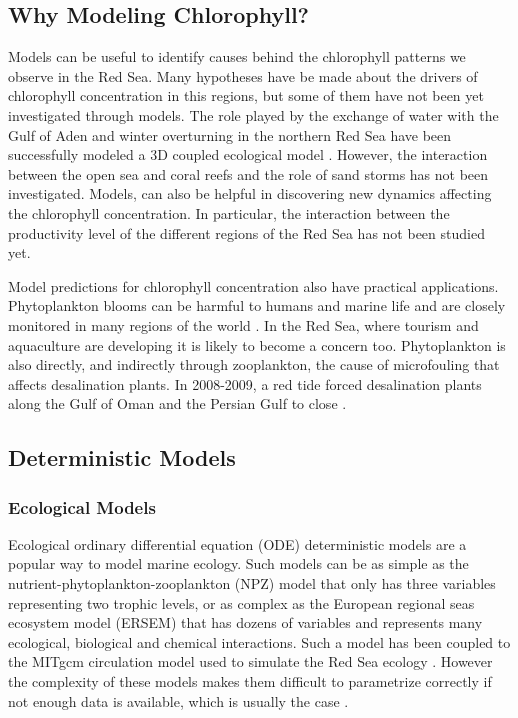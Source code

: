 \subsection{Why Modeling Chlorophyll?}

Models can be useful to identify causes behind the chlorophyll patterns we observe in the Red Sea. Many hypotheses have be made about the drivers of chlorophyll concentration in this regions, but some of them have not been yet investigated through models. The role played by the exchange of water with the Gulf of Aden and winter overturning in the northern Red Sea have been successfully modeled a 3D coupled ecological model \cite{Triantafyllou2014}. However, the interaction between the open sea and coral reefs and the role of sand storms has not been investigated. Models, can also be helpful in discovering new dynamics affecting the chlorophyll concentration. In particular, the interaction between the productivity level of the different regions of the Red Sea has not been studied yet.

Model predictions for chlorophyll concentration also have practical applications. Phytoplankton blooms can be harmful to humans and marine life and are closely monitored in many regions of the world \cite{Pettersson2013}. In the Red Sea, where tourism and aquaculture are developing it is likely to become a concern too. Phytoplankton is also directly, and indirectly through zooplankton, the cause of microfouling that affects desalination plants. In 2008-2009, a red tide forced desalination plants along the Gulf of Oman and the Persian Gulf to close \cite{Richlen2010}.


\subsection{Deterministic Models}

\subsubsection{Ecological Models}

Ecological ordinary differential equation (ODE) deterministic models are a popular way to model marine ecology. Such models can be as simple as the nutrient-phytoplankton-zooplankton (NPZ) model that only has three variables representing two trophic levels, or as complex as the European regional seas ecosystem model (ERSEM) that has dozens of variables and represents many ecological, biological and chemical interactions. Such a model has been coupled to the MITgcm circulation model used to simulate the Red Sea ecology \cite{Triantafyllou2014}. However the complexity of these models makes them difficult to parametrize correctly if not enough data is available, which is usually the case \cite{Anderson2005}.

